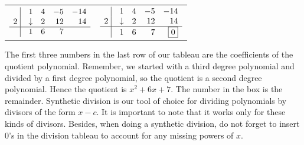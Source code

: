 \begin{center}

\begin{tabular}{cc}

$ \begin{array}{rrrrr}


   \, \, \vline& 1 & 4 & -5  & -14 \\

    2  \, \,\vline& \downarrow &  2  &  12  & 14 \\ \hline
  \vline& 1  &   6  & 7  &    \\  
\end{array}$ \hspace{1in} 

&

$ \begin{array}{rrrrr}


   \, \, \vline& 1 & 4 & -5  & -14 \\

   2  \, \, \vline& \downarrow &  2  &  12  & 14 \\ \hline 
 \vline & 1  &   6  & 7  &  \fbox{$0$}  \\  
\end{array}$ \\



\end{tabular}

\end{center}

\ifvc
	\checkoddpage
{}
\fi

The first three numbers in the last row of our tableau are the coefficients of the quotient polynomial.  Remember, we started with a third degree polynomial and divided by a first degree polynomial, so the quotient is a second degree polynomial.  Hence the quotient is $x^2+6x+7$.  The number in the box is the remainder.  Synthetic division is our tool of choice for dividing polynomials by divisors of the form $x-c$.  It is important to note that it works only for these kinds of divisors. Besides, when doing a synthetic division, do not forget to insert 0's in the division tableau to account for any missing powers of $x$. 

